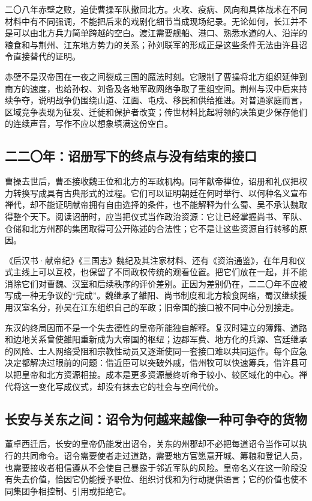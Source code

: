 二〇八年赤壁之败，迫使曹操军队撤回北方。火攻、疫病、风向和具体战术在不同材料中有不同强调，不能把后来的戏剧化细节当成现场纪录。无论如何，长江并不是可以由北方兵力简单跨越的空白。渡江需要舰船、港口、熟悉水道的人、沿岸的粮食和与荆州、江东地方势力的关系；孙刘联军的形成正是这些条件无法由许县诏令直接替代的证明。

赤壁不是汉帝国在一夜之间裂成三国的魔法时刻。它限制了曹操将北方组织延伸到南方的速度，也给孙权、刘备及各地军政网络争取了重组空间。荆州与汉中后来持续争夺，说明战争仍围绕山道、江面、屯戍、移民和供给推进。对普通家庭而言，区域竞争表现为征发、迁徙和保护者改变；传世材料比起将领的决策更少保存他们的连续声音，写作不应以想象填满这份空白。

\subsection{二二〇年：诏册写下的终点与没有结束的接口}

曹操去世后，曹丕接收魏王位和北方的军政机构。同年献帝禅位，诏册和礼仪把权力转换写成具有古典形式的过程。它们可以证明朝廷在何时举行、以何种名义宣布禅代，却不能证明献帝拥有自由选择的条件，也不能解释为什么蜀、吴不承认魏取得整个天下。阅读诏册时，应当把仪式当作政治资源：它让已经掌握尚书、军队、仓储和北方州郡的集团取得可公开陈述的合法性；它不是让这些资源自行转移的原因。

《后汉书·献帝纪》《三国志》魏纪及其注家材料、还有《资治通鉴》，在年月和仪式主线上可以互校，也保留了不同政权传统的观看位置。把它们放在一起，并不能消除它们对曹魏、汉室和后续秩序的评价差别。正因为差别仍在，二二〇年不应被写成一种无争议的“完成”。魏继承了雒阳、尚书制度和北方粮食网络，蜀汉继续援用汉室名分，孙吴在江东组织自己的军政；旧帝国的接口被不同中心分别接走。

东汉的终局因而不是一个失去德性的皇帝所能独自解释。复汉时建立的簿籍、道路和边地关系曾使雒阳重新成为大帝国的枢纽；边郡军费、地方化的兵源、宫廷继承的风险、士人网络受阻和宗教性动员又逐渐使同一套接口难以共同运作。每个应急决定都解决过眼前的问题：借近臣可以突破外戚，借州牧可以快速筹兵，借许县可以把皇帝和北方资源相接。成本是更多资源最终听命于较小、较区域化的中心。禅代将这一变化写成仪式，却没有抹去它的社会与空间代价。

\subsection{长安与关东之间：诏令为何越来越像一种可争夺的货物}

董卓西迁后，长安的皇帝仍能发出诏令，关东的州郡却不必把每道诏令当作可以执行的共同命令。诏令需要使者走过道路，需要地方官愿意开城、筹粮和登记人员，也需要接收者相信遵从不会使自己暴露于邻近军队的风险。皇帝名义在这一阶段没有失去价值，恰因它仍能授予职位、组织讨伐和为行动提供语言；它的价值也使不同集团争相控制、引用或拒绝它。

